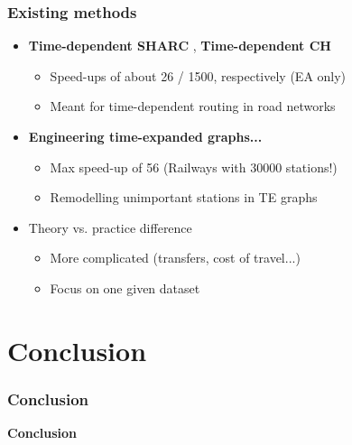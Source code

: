 \documentclass[]{beamer}
\begin{document}
        \begin{frame}
            \frametitle{Existing methods}
			\begin{itemize}
				\item \textbf{Time-dependent SHARC} \cite{sharc08}, \textbf{Time-dependent CH} \cite{timedepch09}
				\begin{itemize}
					\item Speed-ups of about 26 / 1500, respectively (EA only)
					\item Meant for time-dependent routing in road networks
				\end{itemize}
				\item \textbf{Engineering time-expanded graphs...} \cite{engtimeexp09}
		        \begin{itemize}
					\item Max speed-up of 56 (Railways with 30000 stations!)
					\item Remodelling unimportant stations in TE graphs
				\end{itemize}
				\item<2-> Theory vs. practice difference
				\begin{itemize}
					\item More complicated (transfers, cost of travel...)
					\item Focus on one given dataset
				\end{itemize}
			\end{itemize}
        \end{frame}            
    
    \section{Conclusion}
    \begin{frame}
        \frametitle{Conclusion}
        \begin{center}
            \textcolor{elcon-clr!80!black}{\textbf{Conclusion}}
        \end{center}
    \end{frame}
    
\end{document}
